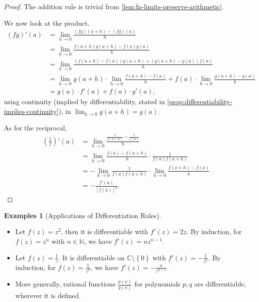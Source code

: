\documentclass[11pt]{article}
\numberwithin{equation}{section}
\theoremstyle{definition}
\newtheorem{examples}[theorem]{Examples}
\theoremstyle{remark}
\newcommand{\pqty}[1]{\left(#1\right)}
\newcommand{\bqty}[1]{\left[#1\right]}
\newcommand{\Bqty}[1]{\left\{#1\right\}}
\newcommand{\CC}{\mathbb C}
\newcommand{\NN}{\mathbb N}
\begin{document}
\begin{proof}
    The addition rule is trivial from \autoref{lem:fn-limits-preserve-arithmetic}.

    We now look at the product.
    \begin{align*}
        \pqty{fg}'\pqty{a} &= \lim_{h \to 0} \frac{\pqty{fg}\pqty{a + h} - \pqty{fg}\pqty{a}}{h} \\
        &= \lim_{h \to 0} \frac{f\pqty{a + h} g\pqty{a + h} - f\pqty{a} g\pqty{a}}{h} \\
        &= \lim_{h \to 0} \frac{\pqty{f\pqty{a + h} - f\pqty{a}} g\pqty{a + h} + \pqty{g\pqty{a + h} - g\pqty{a}} f\pqty{a}}{h} \\
        &= \lim_{h \to 0} g\pqty{a + h} \cdot \lim_{h \to 0} \frac{f\pqty{a + h} - f\pqty{a}}{h} + f\pqty{a} \cdot \lim_{h \to 0} \frac{g\pqty{a + h} - g\pqty{a}}{h} \\
        &= g\pqty{a} \cdot f'\pqty{a} + f\pqty{a} \cdot g'\pqty{a},
    \end{align*}
    using continuity (implied by differentiability, stated in \autoref{prop:differentiability-implies-continuity}), in \(\lim_{h \to 0} g\pqty{a + h} = g\pqty{a}\).

    As for the reciprocal,
    \begin{align*}
        \pqty{\frac{1}{f}}'\pqty{a} &= \lim_{h \to 0} \frac{\frac{1}{f\pqty{a + h}} - \frac{1}{f\pqty{a}}}{h} \\
        &= \lim_{h \to 0} \frac{f\pqty{a} - f\pqty{a + h}}{h} \cdot \frac{1}{f\pqty{a} f\pqty{a + h}} \\
        &= - \lim_{h \to 0} \frac{1}{f\pqty{a} f\pqty{a + h}} \cdot \lim_{h \to 0} \frac{f\pqty{a + h} - f\pqty{a}}{h} \\
        &= - \frac{f'\pqty{a}}{\bqty{f\pqty{a}}^2}.
    \end{align*}
\end{proof}

\begin{examples}[Applications of Differentiation Rules]\label{analysis-unit-0106}
    \label{ex:aplication-of-differentiation-rules}%
    \begin{itemize}
        \item Let \(f\pqty{z} = z^2\), then it is differentiable with \(f'\pqty{z} = 2z\). By induction, for \(f\pqty{z} = z^n\) with \(n \in \NN\), we have \(f'\pqty{z} = n z^{n - 1}\).
        \item Let \(f\pqty{z} = \frac{1}{z}\). It is differentiable on \(\CC \setminus\Bqty{0}\) with \(f'\pqty{z} = -\frac{1}{z^2}\). By induction, for \(f\pqty{z} = \frac{1}{z^n}\), we have \(f'\pqty{z} = - \frac{n}{z^{n + 1}}\).
        \item More generally, rational functions \(\frac{p\pqty{x}}{q\pqty{x}}\) for polynomials \(p, q\) are differentiable, wherever it is defined.
    \end{itemize}
\end{examples}
\end{document}
